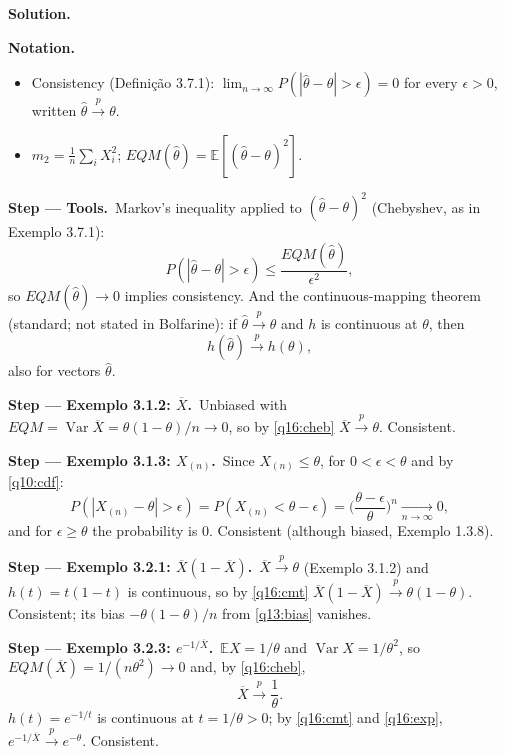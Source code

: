 \documentclass[11pt,a4paper]{article}
\numberwithin{equation}{questao}   %
\newenvironment{notacao}{\par\smallskip\noindent\textbf{Notation.}\begin{itemize}[leftmargin=1.4em,topsep=1pt,itemsep=0pt]\small}{\end{itemize}}
\newcommand{\passo}[2]{\par\smallskip\noindent\textbf{Step --- #1.}~#2}
\newcommand{\solhead}{\par\medskip\noindent{\color{blue!55!black}\rule{\linewidth}{0.3pt}}\par\noindent\textbf{Solution.}}
\newcommand{\E}{\mathbb{E}}
\newcommand{\Var}{\operatorname{Var}}
\begin{document}
\begin{sol}
\solhead
\begin{notacao}
\item Consistency (Definição 3.7.1): $\lim_{n\to\infty}P(|\hat\theta-\theta|>\epsilon)=0$ for every
  $\epsilon>0$, written $\hat\theta\xrightarrow{p}\theta$.
\item $m_2=\frac1n\sum_iX_i^2$; $EQM(\hat\theta)=\E[(\hat\theta-\theta)^2]$.
\end{notacao}

\passo{Tools}{Markov's inequality applied to $(\hat\theta-\theta)^2$ (Chebyshev, as in Exemplo 3.7.1):}
\begin{equation}\label{q16:cheb}
P(|\hat\theta-\theta|>\epsilon)\le\frac{EQM(\hat\theta)}{\epsilon^2},
\end{equation}
so $EQM(\hat\theta)\to0$ implies consistency. And the continuous-mapping theorem (standard; not
stated in Bolfarine): if $\hat\theta\xrightarrow{p}\theta$ and $h$ is continuous at $\theta$, then
\begin{equation}\label{q16:cmt}
h(\hat\theta)\xrightarrow{p}h(\theta),
\end{equation}
also for vectors $\hat\theta$.

\passo{Exemplo 3.1.2: $\overline X$}{Unbiased with $EQM=\Var\overline X=\theta(1-\theta)/n\to0$, so by
\eqref{q16:cheb} $\overline X\xrightarrow{p}\theta$. Consistent.}

\passo{Exemplo 3.1.3: $X_{(n)}$}{Since $X_{(n)}\le\theta$, for $0<\epsilon<\theta$ and by
\eqref{q10:cdf}:}
\begin{equation}\label{q16:max}
P(|X_{(n)}-\theta|>\epsilon)=P(X_{(n)}<\theta-\epsilon)=\Big(\frac{\theta-\epsilon}{\theta}\Big)^n\xrightarrow[n\to\infty]{}0 ,
\end{equation}
and for $\epsilon\ge\theta$ the probability is 0. Consistent (although biased, Exemplo 1.3.8).

\passo{Exemplo 3.2.1: $\overline X(1-\overline X)$}{$\overline X\xrightarrow{p}\theta$ (Exemplo 3.1.2) and
$h(t)=t(1-t)$ is continuous, so by \eqref{q16:cmt} $\overline X(1-\overline X)\xrightarrow{p}\theta(1-\theta)$.
Consistent; its bias $-\theta(1-\theta)/n$ from \eqref{q13:bias} vanishes.}

\passo{Exemplo 3.2.3: $e^{-1/\overline X}$}{$\E X=1/\theta$ and $\Var X=1/\theta^2$, so
$EQM(\overline X)=1/(n\theta^2)\to0$ and, by \eqref{q16:cheb},}
\begin{equation}\label{q16:exp}
\overline X\xrightarrow{p}\frac1\theta .
\end{equation}
$h(t)=e^{-1/t}$ is continuous at $t=1/\theta>0$; by \eqref{q16:cmt} and \eqref{q16:exp},
$e^{-1/\overline X}\xrightarrow{p}e^{-\theta}$. Consistent.


\end{sol}
\end{document}
